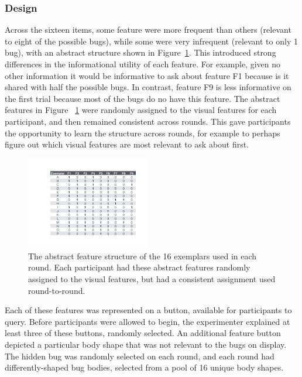 \documentclass[10pt,letterpaper]{article}
\begin{document}
\subsubsection{Design}

Across the sixteen items, some feature were more frequent than others (relevant to eight of the possible
bugs), while some were very infrequent (relevant to only 1 bug), with an
abstract structure shown in Figure~\ref{fig:feature_table}. This introduced
strong differences in the informational utility of each feature.  For example,
given no other information it would be informative to ask about feature F1
because is it shared with half the possible bugs.  In contrast, feature
F9 is less informative on the first trial because most of the bugs do no have this
feature. The abstract features in Figure~
\ref{fig:feature_table} were randomly assigned to the visual features for each 
participant, and then remained consistent across rounds. This gave participants the 
opportunity to learn the structure across rounds, for example to perhaps figure out 
which visual features are most relevant to ask about first.

\begin{figure}[h]
  \centering
  \includegraphics[width=0.48\textwidth]{figures/feature_table}
  \caption{The abstract feature structure of the 16 exemplars used in each round. 
Each participant had these abstract features randomly assigned to the visual 
features, but had a consistent assignment used round-to-round.}
  \label{fig:feature_table}
\end{figure} 

Each of these features was represented on a button, available for participants to query. Before 
participants were allowed to begin, the experimenter explained at least three of 
these buttons, randomly selected. An additional feature button depicted a particular 
body shape that was not relevant to the bugs on display. The hidden bug was 
randomly selected on each round, and each round had differently-shaped bug 
bodies, selected from a pool of 16 unique body shapes.
\end{document}
